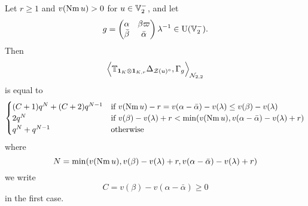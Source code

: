 \begin{theorem}
  Let $r \ge 1$ and $v(\operatorname{Nm} u) > 0$ for $u \in \mathbb V_2^-$, and let
  \[ g =
    \begin{pmatrix} \alpha & \beta \varpi \\ \bar\beta & \bar \alpha \end{pmatrix}
    \lambda^{-1} \in \operatorname{U}(\mathbb V_2^-). \]
  Then
  \[ \Big\langle \mathbb{T}_{\mathbf{1}_K \otimes \mathbf{1}_{K, r}}
    \Delta_{\mathcal Z(u)^\circ}, \Gamma_g \Big\rangle_{\mathcal N_{2,2}} \]
  is equal to
  \[
    \begin{cases}
      (C+1) q^{N} + (C+2) q^{N-1}
        & \text{if } v(\operatorname{Nm} u)-r = v(\alpha - \bar\alpha) - v(\lambda) \le v(\beta) - v(\lambda) \\
      2q^N & \text{if } v(\beta) - v(\lambda) + r < \min(v(\operatorname{Nm} u), v(\alpha - \bar\alpha) - v(\lambda) + r) \\
      q^N + q^{N-1} & \text{otherwise}
    \end{cases}
  \]
  where
  \[ N = \min(v(\operatorname{Nm} u), v(\beta) - v(\lambda) + r, v(\alpha-\bar\alpha) - v(\lambda) + r) \]
  we write
  \[ C = v(\beta) - v(\alpha - \bar\alpha) \ge 0 \]
  in the first case.
\end{theorem}


